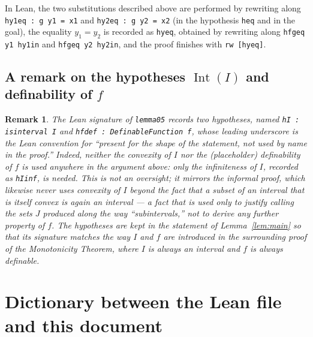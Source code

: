 \documentclass[11pt]{article}
\newtheorem{remark}[definition]{Remark}
\newcommand{\Lean}[1]{\texttt{\begingroup\def\_{\textunderscore\discretionary{}{}{}}#1\endgroup}}
\newcommand{\Int}{\operatorname{Int}}
\begin{document}
In Lean, the two substitutions described above are performed by rewriting along
\Lean{hy1\_eq : g y1 = x1} and \Lean{hy2\_eq : g y2 = x2} (in the hypothesis \Lean{h\_eq} and in
the goal), the equality $y_1=y_2$ is recorded as \Lean{h\_y\_eq}, obtained by rewriting along
\Lean{h\_fg\_eq y1 hy1\_in} and \Lean{h\_fg\_eq y2 hy2\_in}, and the proof finishes with
\Lean{rw [h\_y\_eq]}.
 
\subsection{A remark on the hypotheses \texorpdfstring{$\Int(I)$}{Int(I)} and definability of $f$}
 
\begin{remark}
The Lean signature of \Lean{lemma\_0\_5} records two hypotheses, named \Lean{\_hI : is\_interval I}
and \Lean{\_hf\_def : DefinableFunction f}, whose leading underscore is the Lean convention for
``present for the shape of the statement, not used by name in the proof.'' Indeed, neither the
convexity of $I$ nor the (placeholder) definability of $f$ is used anywhere in the argument above:
only the infiniteness of $I$, recorded as \Lean{hI\_inf}, is needed. This is not an oversight; it
mirrors the informal proof, which likewise never uses convexity of $I$ beyond the fact that a
subset of an interval that is itself convex is again an interval --- a fact that is used only to
justify calling the sets $J$ produced along the way ``subintervals,'' not to derive any further
property of $f$. The hypotheses are kept in the statement of Lemma~\ref{lem:main} so that its
signature matches the way $I$ and $f$ are introduced in the surrounding proof of the Monotonicity
Theorem, where $I$ is always an interval and $f$ is always definable.
\end{remark}
 
\section{Dictionary between the Lean file and this document}
 
\end{document}
